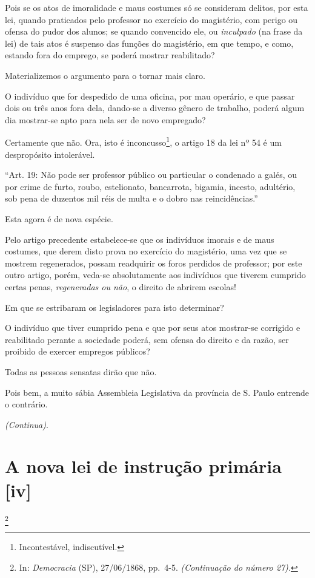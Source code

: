 Pois se os atos de imoralidade e maus costumes só se consideram delitos,
por esta lei, quando praticados pelo professor no exercício do
magistério, com perigo ou ofensa do pudor dos alunos; se quando
convencido ele, ou \emph{inculpado} (na frase da lei) de tais atos é
suspenso das funções do magistério, em que tempo, e como, estando fora
do emprego, se poderá mostrar reabilitado?

Materializemos o argumento para o tornar mais claro.

O indivíduo que for despedido de uma oficina, por mau operário, e que
passar dois ou três anos fora dela, dando-se a diverso gênero de
trabalho, poderá algum dia mostrar-se apto para nela ser de novo
empregado?

Certamente que não. Ora, isto é inconcusso\footnote{Incontestável,
  indiscutível.}, o artigo 18 da lei nº 54 é um despropósito
intolerável.

``Art. 19: Não pode ser professor público ou particular o condenado a
galés, ou por crime de furto, roubo, estelionato, bancarrota, bigamia,
incesto, adultério, sob pena de duzentos mil réis de multa e o dobro nas
reincidências.''

Esta agora é de nova espécie.

Pelo artigo precedente estabelece-se que os indivíduos imorais e de maus
costumes, que derem disto prova no exercício do magistério, uma vez que
se mostrem regenerados, possam readquirir os foros perdidos de
professor; por este outro artigo, porém, veda-se absolutamente aos
indivíduos que tiverem cumprido certas penas, \emph{regeneradas ou não},
o direito de abrirem escolas!

Em que se estribaram os legisladores para isto determinar?

O indivíduo que tiver cumprido pena e que por seus atos mostrar-se
corrigido e reabilitado perante a sociedade poderá, sem ofensa do
direito e da razão, ser proibido de exercer empregos públicos?

Todas as pessoas sensatas dirão que não.

Pois bem, a muito sábia Assembleia Legislativa da província de S. Paulo
entrende o contrário.

\emph{(Continua)}.

\chapter{A nova lei de instrução primária {[}iv{]}}\footnote{In:
  \emph{Democracia} (SP), 27/06/1868, pp.~4-5. \emph{(Continuação do
  número 27).}}

